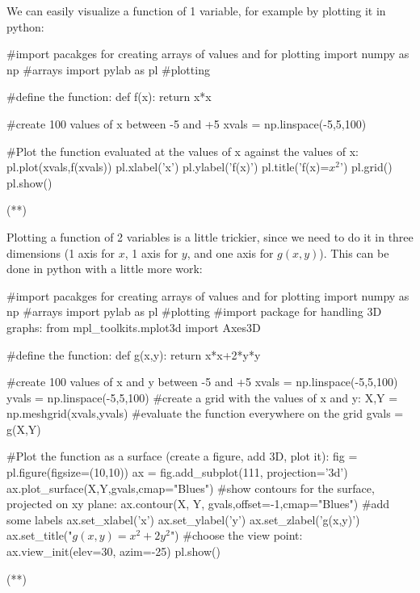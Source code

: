 We can easily visualize a function of 1 variable, for example by plotting it in python:
\begin{python}[caption = Plotting a function of 1 variable]
#import pacakges for creating arrays of values and for plotting
import numpy as np #arrays
import pylab as pl #plotting

#define the function:
def f(x):
    return x*x
    
#create 100 values of x between -5 and +5
xvals = np.linspace(-5,5,100)

#Plot the function evaluated at the values of x against the values of x:
pl.plot(xvals,f(xvals))
pl.xlabel('x')
pl.ylabel('f(x)')
pl.title('f(x)=$x^2$')
pl.grid()
pl.show()
\end{python}
\begin{poutput}
(**)
\end{poutput}

Plotting a function of 2 variables is a little trickier, since we need to do it in three dimensions (1 axis for $x$, 1 axis for $y$, and one axis for $g(x,y)$). This can be done in python with a little more work:
\begin{python}[caption = Plotting a function of 2 variables]
#import pacakges for creating arrays of values and for plotting
import numpy as np #arrays
import pylab as pl #plotting
#import package for handling 3D graphs:
from mpl_toolkits.mplot3d import Axes3D

#define the function:
def g(x,y):
    return x*x+2*y*y
    
#create 100 values of x and y between -5 and +5
xvals = np.linspace(-5,5,100)
yvals = np.linspace(-5,5,100)
#create a grid with the values of x and y:
X,Y = np.meshgrid(xvals,yvals)
#evaluate the function everywhere on the grid
gvals = g(X,Y)

#Plot the function as a surface (create a figure, add 3D, plot it):
fig = pl.figure(figsize=(10,10))
ax = fig.add_subplot(111, projection='3d')
ax.plot_surface(X,Y,gvals,cmap="Blues")
#show contours for the surface, projected on xy plane:
ax.contour(X, Y, gvals,offset=-1,cmap="Blues")
#add some labels
ax.set_xlabel('x')
ax.set_ylabel('y')
ax.set_zlabel('g(x,y)')
ax.set_title("$g(x,y)=x^2+2y^2$")
#choose the view point:
ax.view_init(elev=30, azim=-25)
pl.show()
\end{python}
\begin{poutput}
(**)
\end{poutput}

